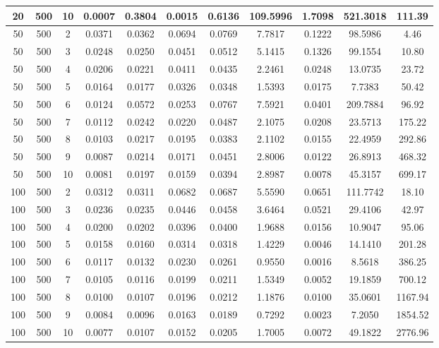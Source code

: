 \documentclass[11.5pt, twoside, a4paper]{article}
\begin{document}
\begin{table}
{\begin{tabular}{|c | c | c | c | c | c | c | c | c | c  | c | }
20 &	500 &	10 &	0.0007 &	0.3804 &	0.0015 &	0.6136 &	109.5996 &	1.7098 &	521.3018 &		111.39 \\ \hline
50 &	500 &	2 &	0.0371 &	0.0362 &	0.0694 &	0.0769 &	7.7817 &	0.1222 &	98.5986 &		4.46 \\ \hline
50 &	500 &	3 &	0.0248 &	0.0250 &	0.0451 &	0.0512 &	5.1415 &	0.1326 &	99.1554 &		10.80 \\ \hline
50 &	500 &	4 &	0.0206 &	0.0221 &	0.0411 &	0.0435 &	2.2461 &	0.0248 &	13.0735 &		23.72 \\ \hline
50 &	500 &	5 &	0.0164 &	0.0177 &	0.0326 &	0.0348 &	1.5393 &	0.0175 &	7.7383 &		50.42 \\ \hline
50 &	500 &	6 &	0.0124 &	0.0572 &	0.0253 &	0.0767 &	7.5921 &	0.0401 &	209.7884 &		96.92 \\ \hline
50 &	500 &	7 &	0.0112 &	0.0242 &	0.0220 &	0.0487 &	2.1075 &	0.0208 &	23.5713 &		175.22 \\ \hline
50 &	500 &	8 &	0.0103 &	0.0217 &	0.0195 &	0.0383 &	2.1102 &	0.0155 &	22.4959 &		292.86 \\ \hline
50 &	500 &	9 &	0.0087 &	0.0214 &	0.0171 &	0.0451 &	2.8006 &	0.0122 &	26.8913 &		468.32 \\ \hline
50 &	500 &	10 &	0.0081 &	0.0197 &	0.0159 &	0.0394 &	2.8987 &	0.0078 &	45.3157 &		699.17 \\ \hline
100 &	500 &	2 &	0.0312 &	0.0311 &	0.0682 &	0.0687 &	5.5590 &	0.0651 &	111.7742 &		18.10 \\ \hline
100 &	500 &	3 &	0.0236 &	0.0235 &	0.0446 &	0.0458 &	3.6464 &	0.0521 &	29.4106 &		42.97 \\ \hline
100 &	500 &	4 &	0.0200 &	0.0202 &	0.0396 &	0.0400 &	1.9688 &	0.0156 &	10.9047 &		95.06 \\ \hline
100 &	500 &	5 &	0.0158 &	0.0160 &	0.0314 &	0.0318 &	1.4229 &	0.0046 &	14.1410 &		201.28 \\ \hline
100 &	500 &	6 &	0.0117 &	0.0132 &	0.0230 &	0.0261 &	0.9550 &	0.0016 &	8.5618 &		386.25 \\ \hline
100 &	500 &	7 &	0.0105 &	0.0116 &	0.0199 &	0.0211 &	1.5349 &	0.0052 &	19.1859 &		700.12 \\ \hline
100 &	500 &	8 &	0.0100 &	0.0107 &	0.0196 &	0.0212 &	1.1876 &	0.0100 &	35.0601 &		1167.94 \\ \hline
100 &	500 &	9 &	0.0084 &	0.0096 &	0.0163 &	0.0189 &	0.7292 &	0.0023 &	7.2050 &		1854.52 \\ \hline
100 &	500 &	10 &	0.0077 &	0.0107 &	0.0152 &	0.0205 &	1.7005 &	0.0072 &	49.1822 &		2776.96 \\ \hline

\end{tabular}}
\end{table}
\end{document}
